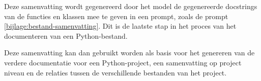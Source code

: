 Deze samenvatting wordt gegenereerd door het model de gegenereerde docstrings van de functies en klassen mee te geven in een prompt, zoals de prompt \ref{bijlage:bestand-samenvatting}.
Dit is de laatste stap in het proces van het documenteren van een Python-bestand.

Deze samenvatting kan dan gebruikt worden als basis voor het genereren van de verdere documentatie voor een Python-project, een samenvatting op project niveau en de relaties tussen de verschillende bestanden van het project.





